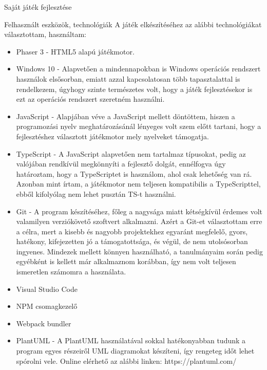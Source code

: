 \begin{MyChapter}{Saját játék fejlesztése}
	\begin{MySection}{Felhasznált eszközök, technológiák}
		A játék elkészítéséhez az alábbi technológiákat választottam, használtam:
		\begin{itemize} %
			\item Phaser 3 - HTML5 alapú játékmotor.
			\item Windows 10 - Alapvetően a mindennapokban is Windows operációs rendszert használok elsősorban, emiatt azzal kapcsolatosan több tapasztalattal is rendelkezem, úgyhogy szinte természetes volt, hogy a játék fejlesztésekor is ezt az operációs rendszert szeretném használni.
			\item JavaScript - Alapjában véve a JavaScript mellett döntöttem, hiszen a programozási nyelv meghatározásánál lényeges volt szem előtt tartani, hogy a fejlesztéshez választott játékmotor mely nyelveket támogatja. %
			\item TypeScript - A JavaScript alapvetően nem tartalmaz típusokat, pedig az valójában rendkívül megkönnyíti a fejlesztő dolgát, ennélfogva úgy határoztam, hogy a TypeScriptet is használom, ahol csak lehetőség van rá. Azonban mint írtam, a játékmotor nem teljesen kompatibilis a TypeScripttel, ebből kifolyólag nem lehet pusztán TS-t használni.
			\item Git - A program készítéséhez, főleg a nagysága miatt kétségkívül érdemes volt valamilyen verziókövető szoftvert alkalmazni. Azért a Git-et választottam erre a célra, mert a kisebb és nagyobb projektekhez egyaránt megfelelő, gyors, hatékony, kifejezetten jó a támogatottsága, és végül, de nem utolsósorban ingyenes. Mindezek mellett könnyen használható, a tanulmányaim során pedig egyébként is kellett már alkalmaznom korábban, így nem volt teljesen ismeretlen számomra a használata.
			\item Visual Studio Code
			\item NPM csomagkezelő
			\item Webpack bundler %
			\item PlantUML - A PlantUML használatával sokkal hatékonyabban tudunk a program egyes részeiről UML diagramokat készíteni, így rengeteg időt lehet spórolni vele. Online elérhető az alábbi linken: https://plantuml.com/ %

\end{itemize}
\end{MySection}
\end{MyChapter}
